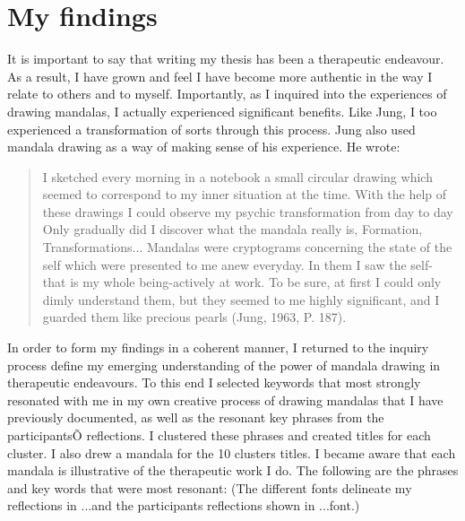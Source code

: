 \chapter{My findings}

It is important to say that writing my thesis has been a therapeutic endeavour. As a result, I have grown and feel I have become more authentic in the way I relate to others and to myself. Importantly, as I inquired into the experiences of drawing mandalas, I actually experienced significant benefits. Like Jung, I too experienced a transformation of sorts through this process. Jung also used mandala drawing as a way of making sense of his experience. He wrote:

\begin{quotation}
I sketched every morning in a notebook a small circular drawing which seemed to correspond to my inner situation at the time. With the help of these drawings I could observe my psychic transformation from day to day
      Only gradually did I discover what the mandala really is, Formation, Transformations...
      Mandalas were cryptograms concerning the state of the self which were presented to me anew everyday. In them I saw the self- that is my whole being-actively at work. To be sure, at first I could only dimly understand them, but they seemed to me highly significant, and I guarded them like precious pearls (Jung, 1963, P. 187).
\end{quotation}

In order to form my findings in a coherent manner, I returned to the inquiry process define my emerging understanding of the power of mandala drawing in therapeutic endeavours. To this end I selected keywords that most strongly resonated with me in my own creative process of drawing mandalas that I have previously documented, as well as the resonant key phrases from the participantsÕ reflections. I clustered these phrases and created titles for each cluster. I also drew a mandala for the 10 clusters titles. I became aware that each mandala is illustrative of the therapeutic work I do. The following are the phrases and key words that were most resonant:
(The different fonts delineate my reflections in ...and the participants reflections shown in ...font.)


